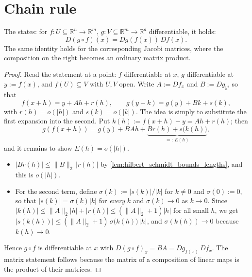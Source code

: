 
\section{Chain rule}
\label{sec:chain_rule}

\begin{theorem}
\label{thm:chain_rule}
The   states: for
$f : U \subseteq \mathbb{R}^n \to \mathbb{R}^m$, $g : V \subseteq \mathbb{R}^m \to \mathbb{R}^d$
differentiable, it holds:
\[D(g\circ f)(x) = Dg(f(x))\,Df(x).\]
The same identity holds for the corresponding Jacobi matrices, where the composition on the
right becomes an ordinary matrix product.
\end{theorem}

\begin{proof}
Read the statement at a point: $f$ differentiable at $x$, $g$ differentiable at $y := f(x)$, and
$f(U) \subseteq V$ with $U,V$ open. Write $A := Df_x$ and $B := Dg_y$, so that
\[f(x+h) = y + Ah + r(h), \qquad g(y+k) = g(y) + Bk + s(k),\]
with $r(h) = o(\lvert h\rvert)$ and $s(k) = o(\lvert k\rvert)$. The idea is simply to substitute
the first expansion into the second. Put $k(h) := f(x+h) - y = Ah + r(h)$; then
\[g(f(x+h)) = g(y) + BAh + \underbrace{Br(h) + s\big(k(h)\big)}_{=:\,E(h)},\]
and it remains to show $E(h) = o(\lvert h\rvert)$.
\begin{itemize}
  \item $\lvert Br(h)\rvert \leq \lVert B\rVert_2\,\lvert r(h)\rvert$ by
    \cref{lem:hilbert_schmidt_bounds_lengths}, and this is $o(\lvert h\rvert)$.
  \item For the second term, define $\sigma(k) := \lvert s(k)\rvert/\lvert k\rvert$ for $k \neq 0$
    and $\sigma(0) := 0$, so that $\lvert s(k)\rvert = \sigma(k)\lvert k\rvert$ for \emph{every} $k$
    and $\sigma(k) \to 0$ as $k \to 0$. Since
    $\lvert k(h)\rvert \leq \lVert A\rVert_2\lvert h\rvert + \lvert r(h)\rvert \leq
    (\lVert A\rVert_2 + 1)\lvert h\rvert$ for all small $h$, we get
    $\lvert s(k(h))\rvert \leq (\lVert A\rVert_2 + 1)\,\sigma\big(k(h)\big)\,\lvert h\rvert$, and
    $\sigma(k(h)) \to 0$ because $k(h) \to 0$.
\end{itemize}
Hence $g\circ f$ is differentiable at $x$ with $D(g\circ f)_x = BA = Dg_{f(x)}\,Df_x$. The matrix
statement follows because the matrix of a composition of linear maps is the product of their
matrices.
\end{proof}

